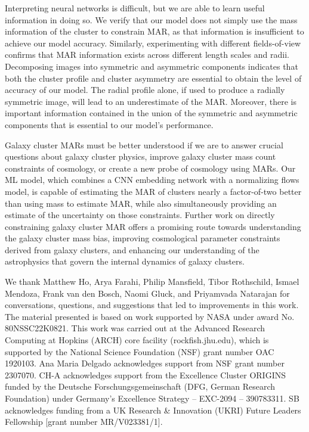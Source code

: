 \documentclass[twocolumn, linenumbers, 11pt]{aastex63}%
\begin{document}
Interpreting neural networks is difficult, but we are able to learn useful information in doing so. We verify that our model does not simply use the mass information of the cluster to constrain MAR, as that information is insufficient to achieve our model accuracy. Similarly, experimenting with different fields-of-view confirms that MAR information exists across different length scales and radii. Decomposing images into symmetric and asymmetric components indicates that both the cluster profile and cluster asymmetry are essential to obtain the level of accuracy of our model. The radial profile alone, if used to produce a radially symmetric image, will lead to an underestimate of the MAR. Moreover, there is important information contained in the union of the symmetric and asymmetric components that is essential to our model's performance.

Galaxy cluster MARs must be better understood if we are to answer crucial questions about galaxy cluster physics, improve galaxy cluster mass count constraints of cosmology, or create a new probe of cosmology using MARs. Our ML model, which combines a CNN embedding network with a normalizing flows model, is capable of estimating the MAR of clusters nearly a factor-of-two better than using mass to estimate MAR, while also simultaneously providing an estimate of the uncertainty on those constraints. Further work on directly constraining galaxy cluster MAR offers a promising route towards understanding the galaxy cluster mass bias, improving cosmological parameter constraints derived from galaxy clusters, and enhancing our understanding of the astrophysics that govern the internal dynamics of galaxy clusters.



\acknowledgements We thank Matthew Ho, Arya Farahi, Philip Mansfield, Tibor Rothschild, Ismael Mendoza, Frank van den Bosch, Naomi Gluck, and Priyamvada Natarajan for conversations, questions, and suggestions that led to improvements in this work. 
The material presented is based on work supported by NASA under award No. 80NSSC22K0821.  This work was carried out at the Advanced Research Computing at Hopkins (ARCH) core facility  (rockfish.jhu.edu), which is supported by the National Science Foundation (NSF) grant number OAC 1920103. Ana Maria Delgado acknowledges support from NSF grant number 2307070. CH-A acknowledges support from the Excellence Cluster ORIGINS funded by
the Deutsche Forschungsgemeinschaft (DFG, German Research Foundation)
under Germany's Excellence Strategy -- EXC-2094 -- 390783311. SB acknowledges funding from a UK Research \& Innovation (UKRI) Future Leaders Fellowship [grant number MR/V023381/1]. 


\end{document}
